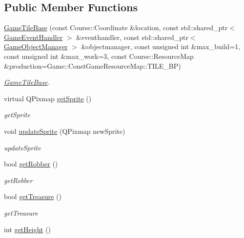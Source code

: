 \subsection*{Public Member Functions}
\begin{DoxyCompactItemize}
\item 
\hyperlink{class_game_1_1_game_tile_base_ac89ced36f5a5c6a9c598a59e0a9bde9f}{Game\-Tile\-Base} (const Course\-::\-Coordinate \&location, const std\-::shared\-\_\-ptr$<$ \hyperlink{class_game_1_1_game_event_handler}{Game\-Event\-Handler} $>$ \&eventhandler, const std\-::shared\-\_\-ptr$<$ \hyperlink{class_game_1_1_game_object_manager}{Game\-Object\-Manager} $>$ \&objectmanager, const unsigned int \&max\-\_\-build=1, const unsigned int \&max\-\_\-work=3, const Course\-::\-Resource\-Map \&production=Game\-::\-Const\-Game\-Resource\-Map\-::\-T\-I\-L\-E\-\_\-\-B\-P)
\begin{DoxyCompactList}\small\item\em \hyperlink{class_game_1_1_game_tile_base}{Game\-Tile\-Base}. \end{DoxyCompactList}\item 
virtual Q\-Pixmap \hyperlink{class_game_1_1_game_tile_base_a88170bec69ba095ca6ffeea469532bff}{get\-Sprite} ()
\begin{DoxyCompactList}\small\item\em get\-Sprite \end{DoxyCompactList}\item 
void \hyperlink{class_game_1_1_game_tile_base_a4c986a263864df783c280cc127b595d3}{update\-Sprite} (Q\-Pixmap new\-Sprite)
\begin{DoxyCompactList}\small\item\em update\-Sprite \end{DoxyCompactList}\item 
bool \hyperlink{class_game_1_1_game_tile_base_a180c056c094375ecad334dadc1413608}{get\-Robber} ()
\begin{DoxyCompactList}\small\item\em get\-Robber \end{DoxyCompactList}\item 
bool \hyperlink{class_game_1_1_game_tile_base_aa20e5ba9b5ba81a4d72786aa0f05495e}{get\-Treasure} ()
\begin{DoxyCompactList}\small\item\em get\-Treasure \end{DoxyCompactList}\item 
int \hyperlink{class_game_1_1_game_tile_base_a65cb55e1e7de1c0c3b8cbf770d8e325c}{get\-Height} ()

\end{DoxyCompactItemize}

